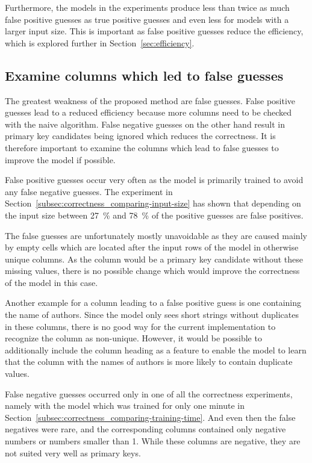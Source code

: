 Furthermore, the models in the experiments produce less than twice as much false positive guesses as true positive guesses and even less for models with a larger input size. This is important as false positive guesses reduce the efficiency, which is explored further in Section~\ref{sec:efficiency}.


\subsection{Examine columns which led to false guesses}\label{subsec:correctness_examine-false-guesses} %
The greatest weakness of the proposed method are false guesses. False positive guesses lead to a reduced efficiency because more columns need to be checked with the naive algorithm. False negative guesses on the other hand result in primary key candidates being ignored which reduces the correctness. It is therefore important to examine the columns which lead to false guesses to improve the model if possible.

False positive guesses occur very often as the model is primarily trained to avoid any false negative guesses. The experiment in Section~\ref{subsec:correctness_comparing-input-size} has shown that depending on the input size between \SI{27}{\percent} and \SI{78}{\percent} of the positive guesses are false positives.

The false guesses are unfortunately mostly unavoidable as they are caused mainly by empty cells which are located after the input rows of the model in otherwise unique columns. As the column would be a primary key candidate without these missing values, there is no possible change which would improve the correctness of the model in this case.

Another example for a column leading to a false positive guess is one containing the name of authors. Since the model only sees short strings without duplicates in these columns, there is no good way for the current implementation to recognize the column as non-unique. However, it would be possible to additionally include the column heading as a feature to enable the model to learn that the column with the names of authors is more likely to contain duplicate values.

False negative guesses occurred only in one of all the correctness experiments, namely with the model which was trained for only one minute in Section~\ref{subsec:correctness_comparing-training-time}. And even then the false negatives were rare, and the corresponding columns contained only negative numbers or numbers smaller than 1. While these columns are negative, they are not suited very well as primary keys. %

